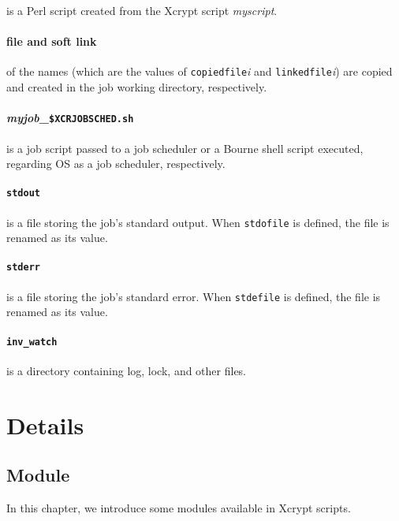 \documentclass[a4paper,10pt]{report}
\begin{document}
is a Perl script created from the Xcrypt script \textit{myscript}.

\subsection*{file and soft link}

of the names (which are the values of \texttt{copiedfile}\textit{i}
and \texttt{linkedfile}\textit{i}) are copied and created in the job
working directory, respectively.
\fi

\subsection*{\textit{myjob}\_\texttt{\$XCRJOBSCHED.sh}}

is a job script passed to a job scheduler or a Bourne shell script
executed, regarding OS as a job scheduler, respectively.

\subsection*{\texttt{stdout}}

is a file storing the job's standard output.  When \texttt{stdofile}
is defined, the file is renamed as its value.

\subsection*{\texttt{stderr}}

is a file storing the job's standard error.  When \texttt{stdefile}
is defined, the file is renamed as its value.

\subsection*{\texttt{inv\_watch}}

is a directory containing log, lock, and other files.

\part{Details}

\chapter{Module}\label{chapmodule}

In this chapter, we introduce some modules available in Xcrypt scripts.
\end{document}
